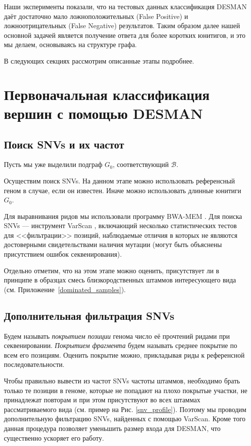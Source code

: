 \documentclass{spbau-diploma}
\begin{document}
Наши эксперименты показали, что на тестовых данных классификация DESMAN даёт достаточно мало ложноположительных (False Positive) и ложноотрицательных (False Negative) результатов. Таким образом далее нашей основной задачей является получение ответа для более коротких юнитигов, и это мы делаем, основываясь на структуре графа.

В следующих секциях рассмотрим описанные этапы подробнее.


\section{Первоначальная классификация вершин с помощью DESMAN}

\subsection{Поиск SNVs и их частот}

Пусть мы уже выделили подграф $G_0$, соответствующий $\mathcal{B}$.

Осуществим поиск SNVs. На данном этапе можно использовать референсный геном в случае, если он известен. Иначе можно использовать длинные юнитиги $G_0$.

Для выравнивания ридов мы использовали программу BWA-MEM \cite{bwa_mem}. Для поиска SNVs --- инструмент VarScan \cite{VarScan}, включающий несколько статистических тестов для <<фильтрации>> позиций, наблюдаемые отличия в которых не являются достоверными свидетельствами наличия мутации (могут быть объяснены присутствием ошибок секвенирования). 

Отдельно отметим, что на этом этапе можно оценить, присутствует ли в принципе в образцах смесь близкородственных штаммов интересующего вида (см. Приложение~\ref{dominated_samples}).

\subsection{Дополнительная фильтрация SNVs} 

Будем называть \textit{покрытием позиции} генома число её прочтений ридами при секвенировании. \textit{Покрытием фрагмента} будем называть среднее покрытие по всем его позициям. Оценить покрытие можно, прикладывая риды к референсной последовательности.

Чтобы правильно вывести из частот SNVs частоты штаммов, необходимо брать только те позиции в геноме, которые не попадают на плохо покрытые участки, не принадлежат повторам и при этом присутствуют во всех штаммах рассматриваемого вида (см. пример на Рис. \ref{snv_profile}). Поэтому мы проводим дополнительную фильтрацию SNVs, найденных с помощью VarScan. Кроме того данная процедура позволяет уменьшить размер входа для DESMAN, что существенно ускоряет его работу.
\end{document}
